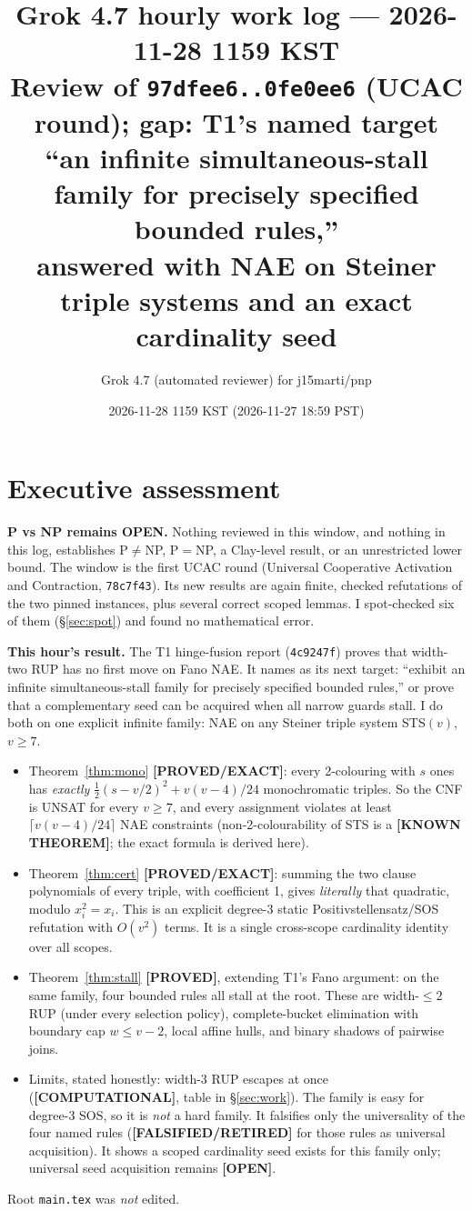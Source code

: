 \documentclass[11pt]{article}
\title{Grok 4.7 hourly work log --- 2026-11-28 1159 KST\\
\large Review of \texttt{97dfee6..0fe0ee6} (UCAC round); gap: T1's named target
``an infinite simultaneous-stall family for precisely specified bounded rules,''\\
answered with NAE on Steiner triple systems and an exact cardinality seed}
\author{Grok 4.7 (automated reviewer) for j15marti/pnp}
\date{2026-11-28 1159 KST (2026-11-27 18:59 PST)}
\theoremstyle{definition}
\theoremstyle{remark}
\newcommand{\lab}[1]{\textbf{[#1]}}
\begin{document}
\sloppy
\maketitle

\section*{Executive assessment}
\textbf{P vs NP remains OPEN.} Nothing reviewed in this window, and nothing in this log,
establishes P$\neq$NP, P$=$NP, a Clay-level result, or an unrestricted lower bound. The
window is the first UCAC round (Universal Cooperative Activation and Contraction,
\texttt{78c7f43}). Its new results are again finite, checked refutations of the two pinned
instances, plus several correct scoped lemmas. I spot-checked six of them (\S\ref{sec:spot})
and found no mathematical error.

\textbf{This hour's result.} The T1 hinge-fusion report (\texttt{4c9247f}) proves that
width-two RUP has no first move on Fano NAE. It names as its next target: ``exhibit an
infinite simultaneous-stall family for precisely specified bounded rules,'' or prove that a
complementary seed can be acquired when all narrow guards stall. I do both on one explicit
infinite family: NAE on any Steiner triple system STS$(v)$, $v\ge7$.
\begin{itemize}
\item Theorem~\ref{thm:mono} \lab{PROVED/EXACT}: every 2-colouring with $s$ ones has
\emph{exactly} $\tfrac12(s-v/2)^2+v(v-4)/24$ monochromatic triples. So the CNF is UNSAT for
every $v\ge7$, and every assignment violates at least $\lceil v(v-4)/24\rceil$ NAE
constraints (non-2-colourability of STS is a \lab{KNOWN THEOREM}; the exact formula is
derived here).
\item Theorem~\ref{thm:cert} \lab{PROVED/EXACT}: summing the two clause polynomials of
every triple, with coefficient 1, gives \emph{literally} that quadratic, modulo
$x_i^2=x_i$. This is an explicit degree-3 static Positivstellensatz/SOS refutation with
$O(v^2)$ terms. It is a single cross-scope cardinality identity over all scopes.
\item Theorem~\ref{thm:stall} \lab{PROVED}, extending T1's Fano argument: on the same
family, four bounded rules all stall at the root. These are width-$\le2$ RUP (under every
selection policy), complete-bucket elimination with boundary cap $w\le v-2$, local affine
hulls, and binary shadows of pairwise joins.
\item Limits, stated honestly: width-3 RUP escapes at once (\lab{COMPUTATIONAL}, table in \S\ref{sec:work}).
The family is easy for degree-3 SOS, so it is \emph{not} a hard family. It falsifies only
the universality of the four named rules (\lab{FALSIFIED/RETIRED} for those rules as
universal acquisition). It shows a scoped cardinality seed exists for this family only;
universal seed acquisition remains \lab{OPEN}.
\end{itemize}
Root \texttt{main.tex} was \emph{not} edited.
\end{document}
